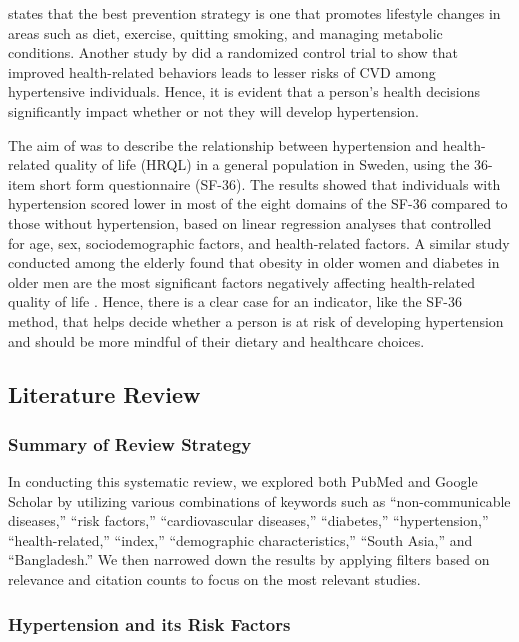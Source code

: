 \documentclass[
  12pt,
  a4paper]{article}
\begin{document}
\citet{budreviciute_management_2020} states that the best prevention strategy is one that promotes lifestyle changes in areas such as diet, exercise, quitting smoking, and managing metabolic conditions. Another study by \citet{burke_lifestyle_2007} did a randomized control trial to show that improved health-related behaviors leads to lesser risks of CVD among hypertensive individuals. Hence, it is evident that a person's health decisions significantly impact whether or not they will develop hypertension.

The aim of \citet{bardage_hypertension_2001} was to describe the relationship between hypertension and health-related quality of life (HRQL) in a general population in Sweden, using the 36-item short form questionnaire (SF-36). The results showed that individuals with hypertension scored lower in most of the eight domains of the SF-36 compared to those without hypertension, based on linear regression analyses that controlled for age, sex, sociodemographic factors, and health-related factors. A similar study conducted among the elderly found that obesity in older women and diabetes in older men are the most significant factors negatively affecting health-related quality of life \citep{banegas_relationship_2007}. Hence, there is a clear case for an indicator, like the SF-36 method, that helps decide whether a person is at risk of developing hypertension and should be more mindful of their dietary and healthcare choices.

\subsection{Literature Review}\label{literature-review}

\subsubsection{Summary of Review Strategy}\label{summary-of-review-strategy}

In conducting this systematic review, we explored both PubMed and Google Scholar by utilizing various combinations of keywords such as ``non-communicable diseases,'' ``risk factors,'' ``cardiovascular diseases,'' ``diabetes,'' ``hypertension,'' ``health-related,'' ``index,'' ``demographic characteristics,'' ``South Asia,'' and ``Bangladesh.'' We then narrowed down the results by applying filters based on relevance and citation counts to focus on the most relevant studies.

\subsubsection{Hypertension and its Risk Factors}\label{hypertension-and-its-risk-factors}
\end{document}
